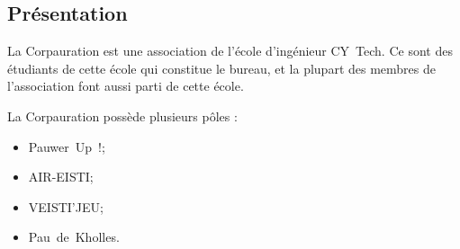 \subsection{Présentation}

La Corpauration est une association de l'école d'ingénieur CY~Tech. Ce sont des étudiants de cette école qui constitue le bureau, et la plupart des membres de l'association font aussi parti de cette école.

\medskip

La Corpauration possède plusieurs pôles :
\begin{itemize}
	\item Pauwer~Up~!;
	\item AIR-EISTI;
	\item VEISTI'JEU;
	\item Pau~de~Kholles. 
\end{itemize}